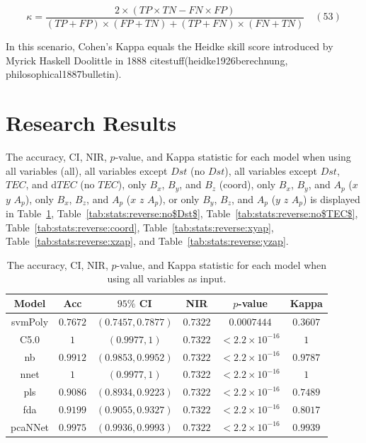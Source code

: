 \documentclass[preprint,12pt]{elsarticle}
\begin{document}
\begin{equation}
	\kappa ={\frac{2\times (TP\times TN-FN\times FP)}{(TP+FP)\times (FP+TN)+(TP+FN)\times (FN+TN)}}
	\quad\left(53\right)
\end{equation}

In this scenario, Cohen's Kappa equals the Heidke skill score introduced by Myrick Haskell Doolittle in 1888 citestuff(heidke1926berechnung, philosophical1887bulletin).

\section{Research Results}

The accuracy, CI, NIR, $p$-value, and Kappa statistic for each model when using all variables (all), all variables except $Dst$ (no $Dst$), all variables except $Dst$, $TEC$, and d$TEC$ (no $TEC$), only $B_{x}$, $B_{y}$, and $B_{z}$ (coord), only $B_{x}$, $B_{y}$, and $A_{p}$ ($x$ $y$ $A_{p}$), only $B_{x}$, $B_{z}$, and $A_{p}$ ($x$ $z$ $A_{p}$), or only $B_{y}$, $B_{z}$, and $A_{p}$ ($y$ $z$ $A_{p}$) is displayed in Table~\ref{tab:stats:reverse:all}, Table~\ref{tab:stats:reverse:no$Dst$}, Table~\ref{tab:stats:reverse:no$TEC$}, Table~\ref{tab:stats:reverse:coord}, Table~\ref{tab:stats:reverse:xyap}, Table~\ref{tab:stats:reverse:xzap}, and Table~\ref{tab:stats:reverse:yzap}.

\begin{table}[!ht]
	\centering
	\begin{tabular}{|c|c|c|c|c|c|}
		\hline
		Model & Acc & $95\%$ CI & NIR & $p$-value & Kappa \\ \hline
		svmPoly & $0.7672$ & $(0.7457, 0.7877)$ & $0.7322$ & $0.0007444$ & $0.3607$ \\ \hline
		C5.0 & $1$ & $(0.9977, 1)$ & $0.7322$ & $< 2.2 \times {10}^{-16}$ & $1$ \\ \hline
		nb & $0.9912$ & $(0.9853, 0.9952)$ & $0.7322$ & $< 2.2 \times {10}^{-16}$ & $0.9787$ \\ \hline
		nnet & $1$ & $(0.9977, 1)$ & $0.7322$ & $< 2.2 \times {10}^{-16}$ & $1$ \\ \hline
		pls & $0.9086$ & $(0.8934, 0.9223)$ & $0.7322$ & $< 2.2 \times {10}^{-16}$ & $0.7489$ \\ \hline
		fda & $0.9199$ & $(0.9055, 0.9327)$ & $0.7322$ & $< 2.2 \times {10}^{-16}$ & $0.8017$ \\ \hline
		pcaNNet & $0.9975$ & $(0.9936, 0.9993)$ & $0.7322$ & $< 2.2 \times {10}^{-16}$ & $0.9939$ \\ \hline
	\end{tabular}
	\caption{The accuracy, CI, NIR, $p$-value, and Kappa statistic for each model when using all variables as input.}
	\label{tab:stats:reverse:all}
\end{table}
\end{document}

